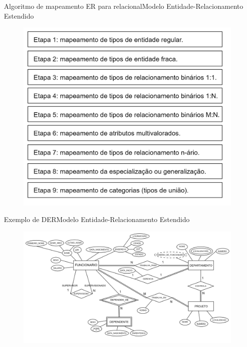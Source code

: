 \documentclass[t]{beamer}
\begin{document}

\begin{ftst}{Algoritmo de mapeamento ER para relacional}{Modelo Entidade-Relacionamento Estendido}
\begin{figure}
    \centering
    \includegraphics[scale=0.12]{Figuras/03_01.png}
\end{figure}
\end{ftst}


\begin{ftst}{Exemplo de DER}{Modelo Entidade-Relacionamento Estendido}
\begin{figure}
    \centering
    \includegraphics[scale=0.11]{Figuras/03_02.png}
\end{figure}
\end{ftst}
\end{document}
